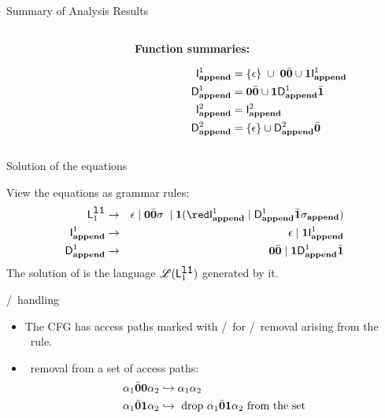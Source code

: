 \documentclass[xcolor=x11names,compress,mathserif]{beamer}
\renewcommand{\(}{\begin{columns}}
\renewcommand{\)}{\end{columns}}
\newcommand{\<}[1]{\begin{column}{#1}}
\renewcommand{\>}{\end{column}}
\begin{document}
\begin{frame}[t]{Summary of Analysis Results}
\begin{columns}[c]
\begin{column}[T]{0.33\textwidth}
\end{column}
\begin{column}[T]{0.33\textwidth}
\vspace*{1.5cm}
\centerline{\bf Function summaries:}
{\red
\begin{align*}
        \mathsf{I}_{\mathit {\mathbf{append}}}^{1} &= \{\epsilon\}\;  \cup\;
      \mathbf{0}\bar{\mathbf{0}}\cup  
      \mathbf{1}\mathsf{I}_{\mathit {\mathbf{append}}}^{1}\\
  \mathsf{D}_{\mathit {\mathbf{append}}}^{1} &= \mathbf{0}\bar{\mathbf{0}}\cup\mathbf{1} \mathsf{D}_{\mathit {\mathbf{append}}}^{1}\bar{\mathbf{1}}\\
  \mathsf{I}_{\mathit {\mathbf{append}}}^{2} &= \mathsf{I}_{\mathit {\mathbf{append}}}^{2}\\
  \mathsf{D}_{\mathit {\mathbf{append}}}^{2} &= \{\epsilon\} \cup \mathsf{D}_{\mathit {\mathbf{append}}}^{2}\bar{\mathbf{0}}
  \end{align*}}
  \end{column}
\end{columns}
\end{frame}

\begin{frame}{Solution of the equations}

  View the equations as grammar rules:
\begin{eqnarray*}
    \Lanv{1}{\lista} &\rightarrow& \epsilon \mid  \acar\bcar\sigma\; \mid 
    \acdr({\red \Uf{\append}{1} \mid \Df{\append}{1}\bcdr\sigma_{\append}})\\
  \Uf{\append}{1}    &\rightarrow&    \epsilon   \mid
   \acdr{\Uf{\append}{1}}\\         
   \Df{\append}{1}
   &\rightarrow&               \acar\bcar               \mid
   \acdr\Df{\append}{1}\bcdr\\
 \end{eqnarray*}
The  solution of  is the   language  $\mathscr{L}(\mathsf{L}_{{1}}^{\mbox{\tt l1}})$ generated    by    it.
\end{frame}

\begin{frame}{\bcar/\bcdr\ handling}

\begin{itemize}
\item<1-> The CFG has access paths marked with \bcar/\bcdr\ for \acar/\acdr\  removal
  arising from the \CONS\  rule.
\item<2-> \acar\   removal from a set of access paths:
\begin{align*}
\alpha_1\bar{\mathbf{0}}\mathbf{0}\alpha_2 &\hookrightarrow
  \alpha_1\alpha_2\\
\alpha_1\bar{\mathbf{0}} \mathbf{1}\alpha_2 &\hookrightarrow
  \mbox{ drop $\alpha_1\bar{\mathbf{0}} \mathbf{1} \alpha_2$ from the set}
\end{align*}
\end{itemize}
\bigskip

\end{frame}
\end{document}
